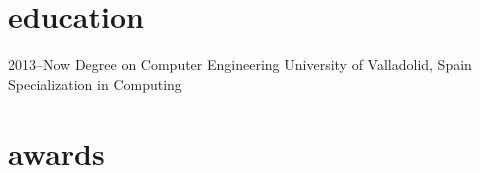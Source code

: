 \documentclass[]{friggeri-cv} %
\begin{document}

\section{education}

\begin{entrylist}


\entry
{2013--Now}
{Degree {\normalfont on Computer Engineering} }
{University of Valladolid, Spain}
{Specialization in Computing}



\end{entrylist}



\section{awards}
\end{document}
